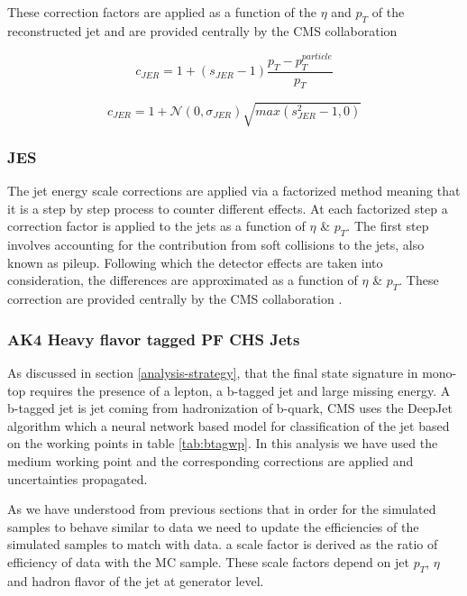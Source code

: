 These correction factors are applied as a function of the $\eta$ and $p_{T}$ of the reconstructed jet and are provided centrally by the CMS collaboration \cite{jersf}

\begin{equation}
\label{eqn:jer1}
c_{JER} = 1 + \left(s_{JER} - 1\right)\frac{p_{T}-p_{T}^{particle}}{p_{T}}
\end{equation}

\begin{equation}
\label{eqn:jer2}
c_{JER} = 1 + \mathcal{N}\left(0, \sigma_{JER}\right)\sqrt{max\left(s_{JER}^{2} - 1, 0\right)}
\end{equation}
\subsubsection{JES}\label{jes}
The jet energy scale corrections are applied via a factorized method meaning that it is a step by step process to counter different effects. At each factorized step a correction factor is applied to the jets as a function of $\eta$ \& $p_{T}$. The first step involves accounting for the contribution from soft collisions to the jets, also known as pileup. Following which the detector effects are taken into consideration, the differences are approximated as a function of $\eta$ \& $p_{T}$. These correction are provided centrally by the CMS collaboration \cite{jersf}.
\subsubsection{AK4 Heavy flavor tagged PF CHS Jets}
As discussed in section \ref{analysis-strategy}, that the final state signature in mono-top requires the presence of a lepton, a b-tagged jet and large missing energy. A b-tagged jet is jet coming from hadronization of b-quark, CMS uses the DeepJet algorithm \cite{Bols_2020} which a neural network based model for classification of the jet based on the working points in table \ref{tab:btagwp}. In this analysis we have used the medium working point and the corresponding corrections are applied and uncertainties propagated.

As we have understood from previous sections that in order for the simulated samples to behave similar to data we need to update the efficiencies of the simulated samples to match with data. a scale factor is derived as the ratio of efficiency of data with the MC sample. These scale factors depend on jet $p_{T}$, $\eta$ and hadron flavor of the jet at generator level.

